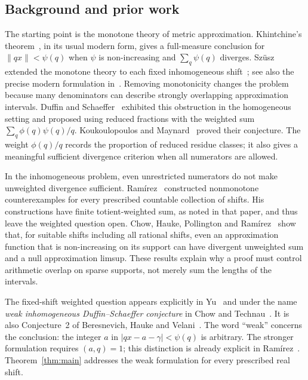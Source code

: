 \subsection{Background and prior work}

The starting point is the monotone theory of metric approximation.
Khintchine's theorem~\cite{Khintchine1924}, in its usual modern form,
gives a full-measure conclusion for $\|qx\|<\psi(q)$ when $\psi$ is
non-increasing and $\sum_q\psi(q)$ diverges. Szüsz extended the
monotone theory to each fixed inhomogeneous shift~\cite{Szusz1958};
see also the precise modern formulation in~\cite{Yu2021}.
Removing monotonicity changes the problem because many denominators
can describe strongly overlapping approximation intervals.
Duffin and Schaeffer~\cite{DS1941} exhibited this obstruction in the
homogeneous setting and proposed using reduced fractions with the
weighted sum $\sum_q\phi(q)\psi(q)/q$. Koukoulopoulos and
Maynard~\cite{KM2020} proved their conjecture. The weight $\phi(q)/q$
records the proportion of reduced residue classes; it also gives a
meaningful sufficient divergence criterion when all numerators are
allowed.

In the inhomogeneous problem, even unrestricted numerators do not
make unweighted divergence sufficient. Ramírez~\cite[Theorem~1]{Ramirez2017}
constructed nonmonotone counterexamples for every prescribed countable
collection of shifts. His constructions have finite totient-weighted
sum, as noted in that paper, and thus leave the weighted question open.
Chow, Hauke, Pollington and
Ramírez~\cite[Theorem~1.5]{CHPR2025} show that, for suitable shifts
including all rational shifts, even an approximation function that is
non-increasing on its support can have divergent unweighted sum and a
null approximation limsup. These results explain why a proof must
control arithmetic overlap on sparse supports, not merely sum the
lengths of the intervals.

The fixed-shift weighted question appears explicitly in
Yu~\cite[Question~1.2]{Yu2021} and under the name \emph{weak inhomogeneous
Duffin--Schaeffer conjecture} in Chow and
Technau~\cite[Conjecture~1.22]{ChowTechnau2024}. It is also
Conjecture~2 of Beresnevich, Hauke and Velani~\cite{BHV2024}.
The word ``weak'' concerns the conclusion: the integer $a$ in
$|qx-a-\gamma|<\psi(q)$ is arbitrary. The stronger formulation
requires $(a,q)=1$; this distinction is already explicit in
Ramírez~\cite{Ramirez2017}. Theorem~\ref{thm:main} addresses the weak
formulation for every prescribed real shift.

